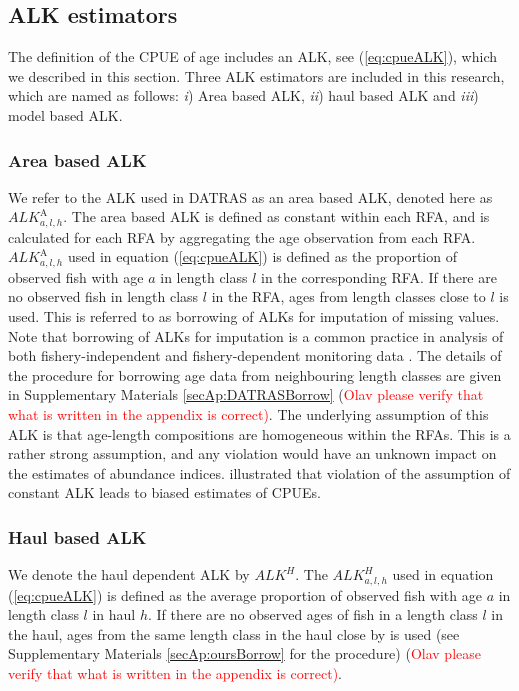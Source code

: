 \documentclass[a4paper 12pt]{article}
\numberwithin{equation}{section}
\newcommand{\ed}[1]{\textcolor{red}{#1}}
\begin{document}
\subsection{ALK estimators}
\label{sec:alkmethods}
The definition of the CPUE of age includes an ALK, see (\ref{eq:cpueALK}), which we described in this section. Three ALK estimators are included in this research, which are named as follows:  \textit{i}) Area based ALK, \textit{ii}) haul based ALK and \textit{iii}) model based ALK.
\subsubsection{Area based ALK}
\label{sec:datrasalkestimator}

We refer to the ALK used in DATRAS  as an area based ALK, denoted here as $ALK^{\text{A}}_{a,l,h}$. The area based ALK is defined as constant within each RFA, and is calculated for each RFA by aggregating the age observation from each RFA. $ALK^{\text{A}}_{a,l,h}$ used in equation (\ref{eq:cpueALK}) is defined as the proportion of observed fish with age $a$ in length class $l$ in the corresponding RFA. If there are no observed fish in length class $l$ in the RFA, ages from length classes close to $l$ is used. This is referred to as borrowing of ALKs for imputation of missing values. Note that borrowing of ALKs for imputation is a common practice in analysis of both fishery-independent and fishery-dependent monitoring data \citep[see for example,][]{aanes2015efficient,catchpole2017challenges}. The details of the procedure for borrowing age data from neighbouring length classes are given in Supplementary Materials \ref{secAp:DATRASBorrow} (\ed{Olav please verify that what is written in the appendix is correct)}.  The underlying assumption of this ALK  is that age-length compositions are homogeneous within the RFAs. This is a rather strong assumption, and any violation would have an unknown impact on the estimates of abundance indices. \citet{aanes2015efficient} illustrated that violation of the assumption of constant ALK leads to biased estimates of CPUEs. 

\subsubsection{Haul based ALK}
\label{sec:haulestimator}
We denote the haul dependent ALK  by  $ALK^{H}$. The $ALK^{H}_{a,l,h}$  used in equation (\ref{eq:cpueALK}) is defined as the average proportion of observed fish with age $a$ in  length class $l$ in haul $h$. If there are no observed ages of fish in a length class $l$ in the haul, ages from the same length class in the haul close by is used (see Supplementary Materials \ref{secAp:oursBorrow} for the procedure) (\ed{Olav please verify that what is written in the appendix is correct)}. 
\end{document}
